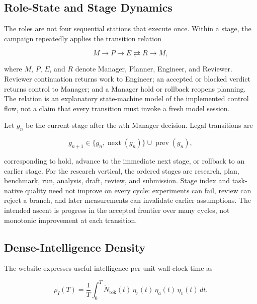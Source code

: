 \subsection{Role-State and Stage Dynamics}

The roles are not four sequential stations that execute once. Within a stage, the
campaign repeatedly applies the transition relation

\begin{equation}
  M \rightarrow P \rightarrow E \rightleftarrows R \rightarrow M,
  \label{eq:role-state-machine}
\end{equation}

where $M$, $P$, $E$, and $R$ denote Manager, Planner, Engineer, and Reviewer.
Reviewer continuation returns work to Engineer; an accepted or blocked verdict
returns control to Manager; and a Manager hold or rollback reopens planning. The
relation is an explanatory state-machine model of the implemented control flow, not
a claim that every transition must invoke a fresh model session.

Let $g_n$ be the current stage after the $n$th Manager decision. Legal transitions
are

\begin{equation}
  g_{n+1}
  \in \{g_n,\operatorname{next}(g_n)\}
  \cup \operatorname{prev}(g_n),
  \label{eq:stage-transition}
\end{equation}

corresponding to hold, advance to the immediate next stage, or rollback to an
earlier stage. For the research vertical, the ordered stages are research, plan,
benchmark, run, analysis, draft, review, and submission. Stage index and task-native
quality need not improve on every cycle: experiments can fail, review can reject a
branch, and later measurements can invalidate earlier assumptions. The intended ascent
is progress in the accepted frontier over many cycles, not monotonic improvement at
each transition.

\subsection{Dense-Intelligence Density}

The website expresses useful intelligence per unit wall-clock time as

\begin{equation}
  \rho_I(T)
  =\frac{1}{T}\int_0^T
  \dot N_{\mathrm{tok}}(t)\,
  \eta_r(t)\,\eta_a(t)\,\eta_v(t)\,dt.
  \label{eq:dense-density}
\end{equation}

